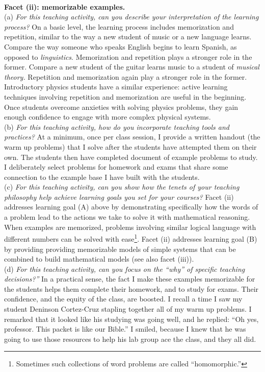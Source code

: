 \documentclass[../../../main.tex]{subfiles}
\begin{document}
\\
\vspace{0.25cm}
\textbf{Facet (ii): memorizable examples.}
\\
\vspace{0.25cm}
(a) \textit{For this teaching activity, can you describe your interpretation of the learning process?} On a basic level, the learning process includes memorization and repetition, similar to the way a new student of music or a new language learns.  Compare the way someone who speaks English begins to learn Spanish, as opposed to \textit{linguistics}.  Memorization and repetition plays a stronger role in the former.  Compare a new student of the guitar learns music to a student of \textit{musical theory.}  Repetition and memorization again play a stronger role in the former.  Introductory physics students have a similar experience: active learning techniques involving repetition and memorization are useful in the beginning.  Once students overcome anxieties with solving physics problems, they gain enough confidence to engage with more complex physical systems.
\\
\vspace{0.25cm}
(b) \textit{For this teaching activity, how do you incorporate teaching tools and practices?}  At a minimum, once per class session, I provide a written handout (the warm up problems) that I solve after the students have attempted them on their own.  The students then have completed document of example problems to study.  I deliberately select problems for homework and exams that share some connection to the example base I have built with the students.
\\
\vspace{0.25cm}
(c) \textit{For this teaching activity, can you show how the tenets of your teaching philosophy help achieve learning goals you set for your courses?}  Facet (ii) addresses learning goal (A) above by demonstrating specifically how the words of a problem lead to the actions we take to solve it with mathematical reasoning.  When examples are memorized, problems involving similar logical language with different numbers can be solved with ease\footnote{Sometimes such collections of word problems are called ``homomorphic.''}.  Facet (ii) addresses learning goal (B) by providing providing memorizable models of simple systems that can be combined to build mathematical models (see also facet (iii)).
\\
\vspace{0.25cm}
(d) \textit{For this teaching activity, can you focus on the ``why'' of specific teaching decisions?''} In a practical sense, the fact I make these examples memorizable for the students helps them complete their homework, and to study for exams.  Their confidence, and the equity of the class, are boosted.  I recall a time I saw my student Deninson Cortez-Cruz stapling together all of my warm up problems.  I remarked that it looked like his studying was going well, and he replied: ``Oh yes, professor.  This packet is like our Bible.''  I smiled, because I knew that he was going to use those resources to help his lab group ace the class, and they all did.
\end{document}
